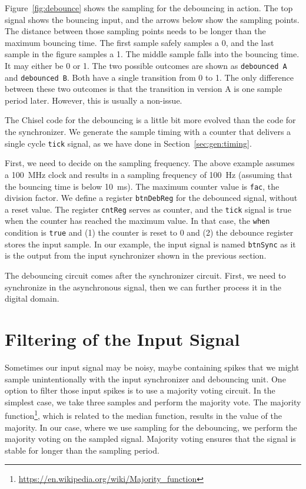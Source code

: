\documentclass[%
    10pt,
    headinclude, footexclude,
    openright, %
    notitlepage,
    cleardoubleempty,
    headsepline,
    pointlessnumbers,
    bibtotoc, idxtotoc,
    ]{scrbook}
\newcommand{\code}[1]{{\lstinline[basicstyle=\small\ttfamily]{#1}}}
\newcommand{\myref}[2]{\href{#1}{#2}}
\renewcommand{\myref}[2]{{#2}{\footnote{\url{#1}}}}
\begin{document}
Figure~\ref{fig:debounce} shows the sampling for the debouncing in action.
The top signal shows the bouncing input, and the arrows below show the sampling
points. The distance between those sampling points needs to be longer
than the maximum bouncing time. The first sample safely samples a 0, and the last
sample in the figure samples a 1. The middle sample falls into the
bouncing time. It may either be 0 or 1. The two possible outcomes are
shown as \code{debounced A} and \code{debounced B}.
Both have a single transition from 0 to 1. The only difference between these
two outcomes is that the transition in version A is one sample period later.
However, this is usually a non-issue.

The Chisel code for the debouncing is a little bit more evolved than the
code for the synchronizer.
We generate the sample timing with a counter that delivers a single
cycle \code{tick} signal, as we have done in Section~\ref{sec:gen:timing}.


First, we need to decide on the sampling frequency. The above example
assumes a 100~MHz clock and results in a sampling frequency of 100~Hz
(assuming that the bouncing time is below 10~ms). The maximum
counter value is \code{fac}, the division factor.
We define a register \code{btnDebReg} for the debounced signal,
without a reset value. The register \code{cntReg} serves
as counter, and the \code{tick} signal is true when the counter has
reached the maximum value. In that case, the \code{when} condition
is \code{true} and (1) the counter is reset to 0 and (2) the debounce
register stores the input sample. In our example, the input signal is named
\code{btnSync} as it is the output from the input synchronizer shown
in the previous section.

The debouncing circuit comes after the synchronizer circuit.
First, we need to synchronize in the asynchronous signal, then
we can further process it in the digital domain.

\section{Filtering of the Input Signal}


Sometimes our input signal may be noisy, maybe containing spikes
that we might sample unintentionally with the input synchronizer and
debouncing unit.
One option to filter those input spikes is to use a majority voting
circuit. In the simplest case, we take three samples and perform
the majority vote. The \myref{https://en.wikipedia.org/wiki/Majority_function}{majority function},
which is related to the median function, results in the value of the majority.
In our case, where we use sampling for the debouncing, we perform the
majority voting on the sampled signal.
Majority voting ensures that the signal is stable for longer than the sampling period.
\end{document}
